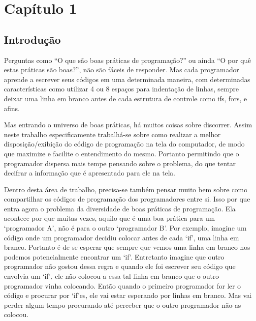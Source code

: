

\cleardoublepage
{}


\chapter{Capítulo 1}

\newpage


\section{Introdução}

    Perguntas como ``O que são boas práticas de programação?'' ou ainda ``O por quê estas práticas
    são boas?'', não são fáceis de responder. Mas cada programador aprende a escrever seus códigos
    em uma determinada maneira, com determinadas características como utilizar 4 ou 8 espaços para
    indentação de linhas, sempre deixar uma linha em branco antes de cada estrutura de controle como
    if\textquotesingle s, for\textquotesingle s, e afins.

    Mas entrando o universo de boas práticas, há muitos coisas sobre discorrer. Assim neste trabalho
    especificamente trabalhá-se sobre como realizar a melhor disposição/exibição do código de
    programação na tela do computador, de modo que maximize e facilite o entendimento do mesmo.
    Portanto permitindo que o programador dispersa mais tempe pensando sobre o problema, do que
    tentar decifrar a informação que é apresentado para ele na tela.

    Dentro desta área de trabalho, precisa-se também pensar muito bem sobre como compartilhar os
    códigos de programação dos programadores entre si. Isso por que entra agora o problema da
    diversidade de boas práticas de programação. Ela acontece por que muitas vezes, aquilo que é uma
    boa prática para um `programador A', não é para o outro `programador B'. Por exemplo, imagine um
    código onde um programador decidiu colocar antes de cada `if', uma linha em branco. Portanto é
    de se esperar que sempre que vemos uma linha em branco nos podemos potencialmente encontrar um
    `if'. Entretanto imagine que outro programador não gostou dessa regra e quando ele foi escrever
    seu código que envolvia um `if', ele não colocou a essa tal linha em branco que o outro
    programador vinha colocando. Então quando o primeiro programador for ler o código e procurar por
    `if'es, ele vai estar esperando por linhas em branco. Mas vai perder algum tempo procurando até
    perceber que o outro programador não as colocou.


